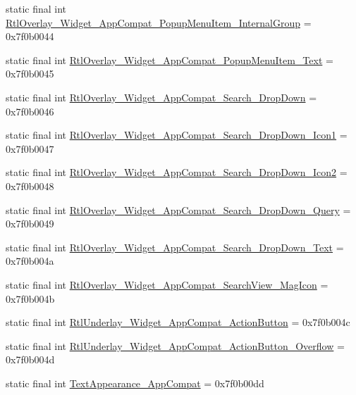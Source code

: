 \begin{CompactItemize}
\item 
static final int \hyperlink{classandroid_1_1support_1_1v7_1_1mediarouter_1_1_r_1_1style_db39d8f158df38e3e09be5661c431e10}{RtlOverlay\_\-Widget\_\-AppCompat\_\-PopupMenuItem\_\-InternalGroup} = 0x7f0b0044
\item 
static final int \hyperlink{classandroid_1_1support_1_1v7_1_1mediarouter_1_1_r_1_1style_7d04ff80aa946c816d742d52bd588044}{RtlOverlay\_\-Widget\_\-AppCompat\_\-PopupMenuItem\_\-Text} = 0x7f0b0045
\item 
static final int \hyperlink{classandroid_1_1support_1_1v7_1_1mediarouter_1_1_r_1_1style_f7214afb6cb46891881a96af01467776}{RtlOverlay\_\-Widget\_\-AppCompat\_\-Search\_\-DropDown} = 0x7f0b0046
\item 
static final int \hyperlink{classandroid_1_1support_1_1v7_1_1mediarouter_1_1_r_1_1style_eeb2843ae4c5562eaa9b4bbc6731b942}{RtlOverlay\_\-Widget\_\-AppCompat\_\-Search\_\-DropDown\_\-Icon1} = 0x7f0b0047
\item 
static final int \hyperlink{classandroid_1_1support_1_1v7_1_1mediarouter_1_1_r_1_1style_b2ad86fe6e3c84fd8f2929dd1e965efc}{RtlOverlay\_\-Widget\_\-AppCompat\_\-Search\_\-DropDown\_\-Icon2} = 0x7f0b0048
\item 
static final int \hyperlink{classandroid_1_1support_1_1v7_1_1mediarouter_1_1_r_1_1style_a2c4ed3a1950a06aa95b31a420576bda}{RtlOverlay\_\-Widget\_\-AppCompat\_\-Search\_\-DropDown\_\-Query} = 0x7f0b0049
\item 
static final int \hyperlink{classandroid_1_1support_1_1v7_1_1mediarouter_1_1_r_1_1style_c37415ec560ce70af8f852b66086ddd7}{RtlOverlay\_\-Widget\_\-AppCompat\_\-Search\_\-DropDown\_\-Text} = 0x7f0b004a
\item 
static final int \hyperlink{classandroid_1_1support_1_1v7_1_1mediarouter_1_1_r_1_1style_02077eff250b83cc822718fe5ed7d449}{RtlOverlay\_\-Widget\_\-AppCompat\_\-SearchView\_\-MagIcon} = 0x7f0b004b
\item 
static final int \hyperlink{classandroid_1_1support_1_1v7_1_1mediarouter_1_1_r_1_1style_653849d015558ac83cc1a2268ed279bc}{RtlUnderlay\_\-Widget\_\-AppCompat\_\-ActionButton} = 0x7f0b004c
\item 
static final int \hyperlink{classandroid_1_1support_1_1v7_1_1mediarouter_1_1_r_1_1style_629b80617e8ba71120116087c4d4b905}{RtlUnderlay\_\-Widget\_\-AppCompat\_\-ActionButton\_\-Overflow} = 0x7f0b004d
\item 
static final int \hyperlink{classandroid_1_1support_1_1v7_1_1mediarouter_1_1_r_1_1style_3b6ac75d7cc1f18add0d657f864cdb26}{TextAppearance\_\-AppCompat} = 0x7f0b00dd

\end{CompactItemize}

